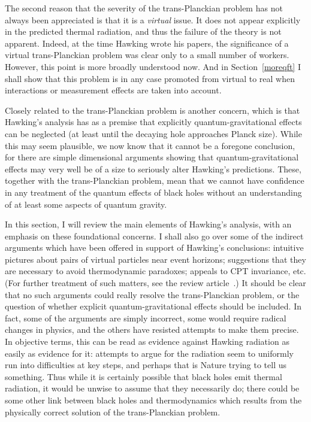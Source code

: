 \documentclass[
%
draft    %
,numberedheadings 
,bibliocites
  ]
  {aipproc}
\begin{document}
The second reason that the severity of the trans-Planckian problem has not always been appreciated is that it is a {\em virtual} issue.  It does not appear explicitly in the predicted thermal radiation, and thus the failure of the theory is not apparent.  Indeed, at the time Hawking wrote his papers, the significance of a virtual trans-Planckian problem was clear only to a small number of workers.  However, this point is more broadly understood now.  And in Section~\ref{moreqft} I shall show that this problem is in any case promoted from virtual to real when interactions or measurement effects are taken into account.

Closely related to the trans-Planckian problem is another concern, which is that Hawking's analysis has as a premise that explicitly quantum-gravitational effects can be neglected (at least until the decaying hole approaches Planck size).  While this may seem plausible, we now know that it cannot be a foregone conclusion, for there are simple dimensional arguments showing that
quantum-gravitational effects may very well be of a size to seriously alter Hawking's predictions.
These, together with the trans-Planckian problem, mean that we cannot have confidence in any treatment of the quantum effects of black holes without an understanding of at least some aspects of quantum gravity.

In this section, I will review the main elements of Hawking's analysis, with an emphasis on these foundational concerns.  I shall also go over some of the indirect arguments which have been offered in support of Hawking's conclusions:
intuitive pictures about pairs of virtual particles near event horizons;
suggestions that they are necessary to avoid thermodynamic paradoxes; appeals to CPT invariance, etc.  (For further treatment of such matters, see the review article~\citep{Helfer:2003va}.)
It should be clear that no such arguments could really resolve the trans-Planckian problem, or the question of whether 
explicit quantum-gravitational effects should be included.  In fact, some of the arguments are simply incorrect, some would require radical changes in physics, and the others have resisted attempts to make them precise.  In objective terms,
this can be read as evidence against Hawking radiation as easily as evidence for it:  attempts to argue for the radiation seem to uniformly run into difficulties at key steps, and perhaps that is Nature trying to tell us something.
Thus while it is certainly possible that black holes emit thermal radiation, it would be unwise to assume that they necessarily do; there could be some other link between black holes and thermodynamics which results from the physically correct solution of the trans-Planckian problem.
\end{document}
